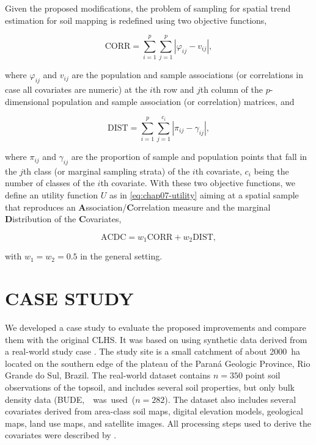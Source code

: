 Given the proposed modifications, the problem of sampling for spatial trend estimation for soil mapping is 
redefined using two objective functions,

\begin{equation}
 \text{CORR} = \sum_{i=1}^{p}\sum_{j=1}^{p}|\varphi_{ij} - v_{ij}|,
\end{equation}\label{eq:chap07-corr}

\noindent where $\varphi_{ij}$ and $v_{ij}$ are the population and sample associations (or correlations in 
case all covariates are numeric) at the $i$th row and $j$th column of the $p$-dimensional population and 
sample association (or correlation) matrices, and

\begin{equation}
 \text{DIST} = \sum_{i=1}^{p}\sum_{j=1}^{c_i} |\pi_{ij} - \gamma_{ij}|,
\end{equation}\label{eq:chap07-dist}

\noindent where $\pi_{ij}$ and $\gamma_{ij}$ are the proportion of sample and population points that fall 
in the $j$th class (or marginal sampling strata) of the $i$th covariate, $c_i$ being the number of classes of 
the $i$th covariate. With these two objective functions, we define an utility function $U$ as in 
\autoref{eq:chap07-utility} aiming at a spatial sample that reproduces an 
\textbf{A}ssociation/\textbf{C}orrelation measure and the marginal \textbf{D}istribution of the 
\textbf{C}ovariates,

\begin{equation}
 \text{ACDC} = w_1\text{CORR} + w_2 \text{DIST},
\end{equation}\label{eq:chap07-acdc}

\noindent with $w_1 = w_2 = 0.5$ in the general setting.

\section{CASE STUDY}

We developed a case study to evaluate the proposed improvements and compare them with the original CLHS. It 
was based on using synthetic data derived from a real-world study case \cite{Samuel-RosaEtAl2015}. The study 
site is a small catchment of about \SI{2000}{\hectare} located on the southern edge of the plateau of the 
Paraná Geologic Province, Rio Grande do Sul, Brazil. The real-world dataset contains $n = 350$ point soil 
observations of the topsoil, and includes several soil properties, but only bulk density data 
(BUDE,~\si{\mega\gram\per\metre\cubic} was used ($n = 282$). The dataset also includes several covariates 
derived from area-class soil maps, digital elevation models, geological maps, land use maps, and satellite 
images. All processing steps used to derive the covariates were described by \citet{Samuel-RosaEtAl2015}.

